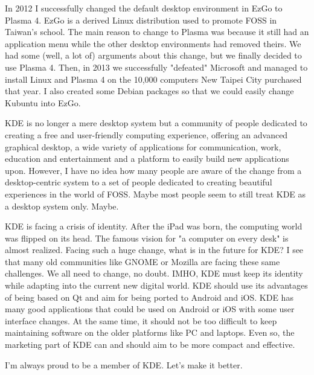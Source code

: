 In 2012 I successfully changed the default desktop environment in EzGo to
Plasma 4. EzGo is a derived Linux distribution used to promote
FOSS in Taiwan's school. The main reason to change to Plasma was
because it still had an application menu while the other desktop environments
had removed theirs. We had some (well, a lot of) arguments about this change,
but we finally decided to use Plasma 4. Then, in 2013 we successfully
"defeated" Microsoft and managed to install Linux and Plasma 4 on the 
10,000 computers New Taipei City purchased that year. 
I also created some Debian packages so that we could easily change Kubuntu into EzGo. 

KDE is no longer a mere desktop system but a community of people
dedicated to creating a free and user-friendly computing experience, offering an advanced
graphical desktop, a wide variety of applications for communication,
work, education and entertainment and a platform to easily build new
applications upon. However, I have no idea how many people are aware of the
change from a desktop-centric system to a set of people dedicated to
creating beautiful experiences in the world of FOSS. Maybe most people
seem to still treat KDE as a desktop system only. Maybe. 

KDE is facing a crisis of identity. After the iPad was born, the 
computing world was flipped on its head. The famous vision for 
"a computer on every desk" is almost realized. Facing
such a huge change, what is in the future for KDE?
I see that many old communities like GNOME or Mozilla are facing these
same challenges. We all need to change, no doubt. IMHO, KDE must
keep its identity while adapting into the current new digital
world. KDE should use its advantages of being based on Qt and aim for
being ported to Android and iOS. KDE has many good applications that
could be used on Android or iOS with some user interface changes.
At the same time, it should not be too difficult to keep maintaining software
on the older platforms like PC and laptops. Even so, 
the marketing part of KDE can and should aim to be more compact and
effective.

I'm always proud to be a member of KDE. Let's make it better.
